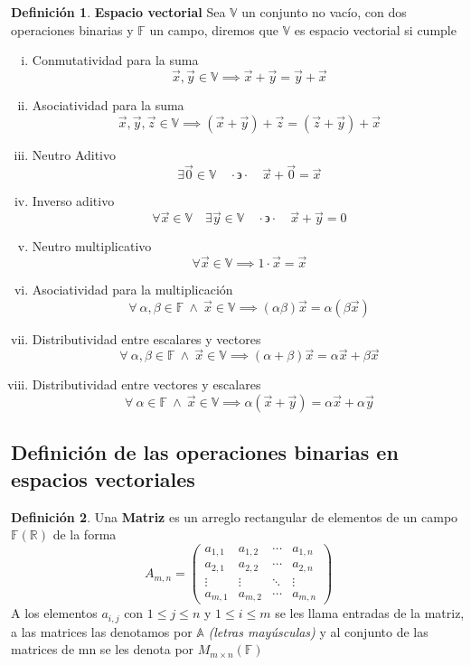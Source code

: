 \documentclass[letterpaper]{article}
\newcommand{\V}{\mathds{V}}
\newcommand{\F}{\mathds{F}}
\newcommand{\tq}{ \quad \cdot  \backepsilon \cdot \quad }
\newcommand{\R}{\mathds{R}}
\renewcommand{\*}{\cdot}
\theoremstyle{definition}
\newtheorem{definition}{Definición}[section]
\begin{document}
	\begin{definition}
		\textbf{Espacio vectorial} Sea $ \V $ un conjunto  no vacío, con dos operaciones binarias y $ \F $ un campo, diremos que $ \V $ es espacio vectorial si cumple
		\begin{enumerate}[(i)]
			\item Conmutatividad para la suma
			\[ \vec{x}, \vec{y} \in \V \implies \vec{x} + \vec{y} = \vec{y} + \vec{x} \]
			\item Asociatividad para la suma
			\[ \vec{x},\vec{y},\vec{z} \in \V \implies (\vec{x} + \vec{y}) + \vec{z} = ( \vec{z} + \vec{y}) + \vec{x}  \]
			\item Neutro Aditivo
			\[ \exists \vec{0}\in \V \tq \vec{x} + \vec{0} = \vec{x} \]
			\item Inverso aditivo 
			\[\forall \vec{x} \in \V \quad \exists \vec{y} \in \V \tq \vec{x} + \vec{y} = 0 \]
			\item Neutro multiplicativo
			\[\forall \vec{x} \in \V \implies 1\* \vec{x} = \vec{x} \]
			\item Asociatividad para la multiplicación
			\[ \forall \ \alpha, \beta \in \F \ \land \ \vec{x} \in \V \implies (\alpha \beta)\vec{x} = \alpha(\beta \vec{x}) \]
			\item Distributividad entre escalares y vectores
			\[  \forall \ \alpha, \beta \in \F \ \land \ \vec{x} \in \V \implies (\alpha + \beta)\vec{x} = \alpha \vec{x} + \beta \vec{x} \]
			\item Distributividad entre vectores y escalares
			\[  \forall \ \alpha \in \F \ \land \ \vec{x} \in \V \implies \alpha (\vec{x} + \vec{y}) = \alpha \vec{x} + \alpha \vec{y} \]	
		\end{enumerate}
	\end{definition}
	\subsection{Definición de las operaciones binarias en espacios vectoriales}
	\begin{definition}
		Una \textbf{Matriz} es un arreglo rectangular de elementos de un campo $ \F(\R) $ de la forma
		\begin{equation*}
		A_{m,n} = 
		\begin{pmatrix}
		a_{1,1} & a_{1,2} & \cdots & a_{1,n} \\
		a_{2,1} & a_{2,2} & \cdots & a_{2,n} \\
		\vdots  & \vdots  & \ddots & \vdots  \\
		a_{m,1} & a_{m,2} & \cdots & a_{m,n} 
		\end{pmatrix}
		\end{equation*}
		A los elementos $ a_{i,j} $ con $ 1 \leq j \leq n $ y $ 1 \leq i \leq m $ se les llama entradas de la matriz, a las matrices las denotamos por $ \mathds{A} $ \textit{(letras mayúsculas)} y al conjunto de las matrices de mn se les denota por $ M_{m\times n}(\F) $
		
	\end{definition}
	
	
\end{document}
